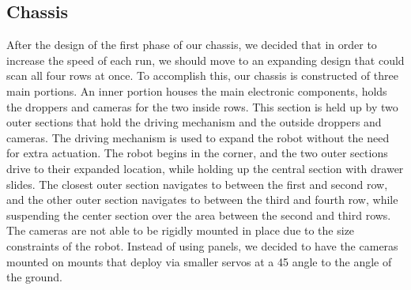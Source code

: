 \documentclass[11pt, hidelinks]{report}
\begin{document}
\subsection{Chassis}
After the design of the first phase of our chassis, we decided that in order to increase the speed of each run, we should move to an expanding design that could scan all four rows at once.  To accomplish this, our chassis is constructed of three main portions.  An inner portion houses the main electronic components, holds the droppers and cameras for the two inside rows.  This section is held up by two outer sections that hold the driving mechanism and the outside droppers and cameras.  The driving mechanism is used to expand the robot without the need for extra actuation.  The robot begins in the corner, and the two outer sections drive to their expanded location, while holding up the central section with drawer slides.  The closest outer section navigates to between the first and second row, and the other outer section navigates to between the third and fourth row, while suspending the center section over the area between the second and third rows.  The cameras are not able to be rigidly mounted in place due to the size constraints of the robot.  Instead of using panels, we decided to have the cameras mounted on mounts that deploy via smaller servos at a {45\textdegree} angle to the angle of the ground.  
\end{document}
